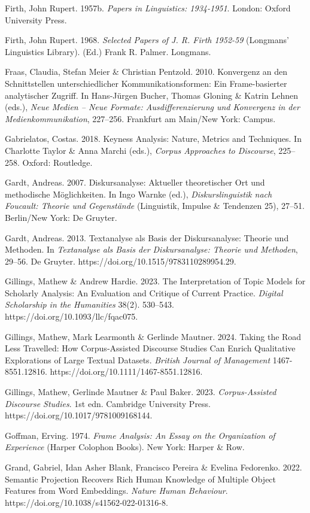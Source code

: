 Firth, John Rupert. 1957b. \emph{Papers in Linguistics: 1934-1951}. London: Oxford University Press.

Firth, John Rupert. 1968. \emph{Selected Papers of J. R. Firth 1952-59} (Longmans' Linguistics Library). (Ed.) Frank R. Palmer. Longmans.

Fraas, Claudia, Stefan Meier \& Christian Pentzold. 2010. Konvergenz an den Schnittstellen unterschiedlicher Kommunikationsformen: Ein Frame-basierter analytischer Zugriff. In Hans-Jürgen Bucher, Thomas Gloning \& Katrin Lehnen (eds.), \emph{Neue Medien -- Neue Formate: Ausdifferenzierung und Konvergenz in der Medienkommunikation}, 227--256. Frankfurt am Main/New York: Campus.

Gabrielatos, Costas. 2018. Keyness Analysis: Nature, Metrics and Techniques. In Charlotte Taylor \& Anna Marchi (eds.), \emph{Corpus Approaches to Discourse}, 225--258. Oxford: Routledge.

Gardt, Andreas. 2007. Diskursanalyse: Aktueller theoretischer Ort und methodische Möglichkeiten. In Ingo Warnke (ed.), \emph{Diskurslinguistik nach Foucault: Theorie und Gegenstände} (Linguistik, Impulse \& Tendenzen 25), 27--51. Berlin/New York: De Gruyter.

Gardt, Andreas. 2013. Textanalyse als Basis der Diskursanalyse: Theorie und Methoden. In \emph{Textanalyse als Basis der Diskursanalyse: Theorie und Methoden}, 29--56. De Gruyter. https://doi.org/10.1515/9783110289954.29.

Gillings, Mathew \& Andrew Hardie. 2023. The Interpretation of Topic Models for Scholarly Analysis: An Evaluation and Critique of Current Practice. \emph{Digital Scholarship in the Humanities} 38(2). 530--543. https://doi.org/10.1093/llc/fqac075.

Gillings, Mathew, Mark Learmonth \& Gerlinde Mautner. 2024. Taking the Road Less Travelled: How Corpus‐Assisted Discourse Studies Can Enrich Qualitative Explorations of Large Textual Datasets. \emph{British Journal of Management} 1467-8551.12816. https://doi.org/10.1111/1467-8551.12816.

Gillings, Mathew, Gerlinde Mautner \& Paul Baker. 2023. \emph{Corpus-Assisted Discourse Studies}. 1st edn. Cambridge University Press. https://doi.org/10.1017/9781009168144.

Goffman, Erving. 1974. \emph{Frame Analysis: An Essay on the Organization of Experience} (Harper Colophon Books). New York: Harper \& Row.

Grand, Gabriel, Idan Asher Blank, Francisco Pereira \& Evelina Fedorenko. 2022. Semantic Projection Recovers Rich Human Knowledge of Multiple Object Features from Word Embeddings. \emph{Nature Human Behaviour}. https://doi.org/10.1038/s41562-022-01316-8.

